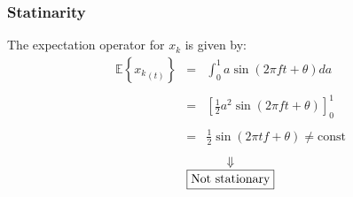 \documentclass[11pt, a4paper]{article}
\begin{document}
\subsubsection{Statinarity}
The expectation operator for $x_k$ is given by:
\begin{equation}
    \begin{array}{rcl}
        \displaystyle \mathbb{E}{\left\{{x_k}_{\left(t\right)}\right\}} & = & \displaystyle \int_{0}^{1}{a\sin{\left(2\pi ft+\theta\right)}da} \\\\
        & = & \displaystyle \left[\frac{1}{2}a^2\sin{\left(2\pi ft+\theta\right)}\right]_0^1 \\\\
        & = & \displaystyle \frac{1}{2}\sin{\left(2\pi tf+\theta\right)}\ne\text{const}
    \end{array}
\end{equation}
\begin{equation*}
    \begin{array}{c}
        \Downarrow \\
        \boxed{$\text{Not stationary}$}
    \end{array}
\end{equation*}
\end{document}
